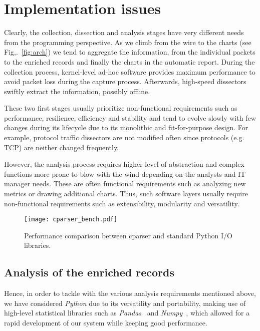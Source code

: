 \documentclass[AMA,STIX1COL]{WileyNJD-v2}
\begin{document}
\section{Implementation issues}

Clearly, the collection, dissection and analysis stages have very different needs from the programming perspective. As we climb from the wire to the charts (see Fig,.~\ref{fig:arch}) we tend to aggregate the information, from the individual packets to the enriched records and finally the charts in the automatic report. During the collection process, kernel-level ad-hoc software provides maximum performance to avoid packet loss during the capture process. Afterwards, high-speed dissectors swiftly extract the information, possibly offline.  %

These two first stages usually prioritize non-functional requirements such as performance, resilience, efficiency and stability and tend to evolve slowly with few changes during its lifecycle due to its monolithic and fit-for-purpose design. For example, protocol traffic dissectors are not modified often since protocols (e.g. TCP) are neither changed frequently.

However, the analysis process requires higher level of abstraction and complex functions more prone to blow with the wind depending on the analysts and IT manager needs. These are often functional requirements such as analyzing new metrics or drawing additional charts. Thus, such software layers usually require non-functional requirements such as extensibility, modularity and versatility.

\begin{figure}[b!]
\centering
\texttt{[image: cparser\_bench.pdf]}
\captionsetup{justification=centering}
\caption{Performance comparison between \textsf{cparser} and standard Python I/O libraries.}
\label{fig:cparser}
\vspace{2em}
\end{figure}

\subsection{Analysis of the enriched records}

Hence, in order to tackle with the various analysis requirements mentioned above, we have considered \emph{Python} due to its versatility and portability, making use of high-level statistical libraries such as \emph{Pandas}~\cite{pandas_web} and \emph{Numpy}~\cite{numpy_web}, which allowed for a rapid development of our system while keeping good performance. 
\end{document}
